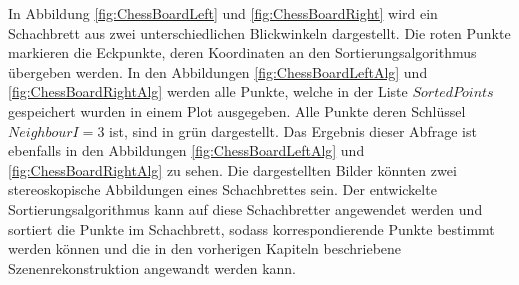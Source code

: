 



%
%
%


In Abbildung \ref{fig:ChessBoardLeft} und \ref{fig:ChessBoardRight} wird ein Schachbrett aus zwei unterschiedlichen Blickwinkeln dargestellt. Die roten Punkte markieren die Eckpunkte, deren Koordinaten an den Sortierungsalgorithmus übergeben werden. In den Abbildungen \ref{fig:ChessBoardLeftAlg} und \ref{fig:ChessBoardRightAlg} werden alle Punkte, welche in der Liste $SortedPoints$ gespeichert wurden in einem Plot ausgegeben. Alle Punkte deren Schlüssel $NeighbourI = 3$ ist, sind in grün dargestellt. Das Ergebnis dieser Abfrage ist ebenfalls in den Abbildungen \ref{fig:ChessBoardLeftAlg} und \ref{fig:ChessBoardRightAlg} zu sehen. Die dargestellten Bilder könnten zwei stereoskopische Abbildungen eines Schachbrettes sein. Der entwickelte Sortierungsalgorithmus kann auf diese Schachbretter angewendet werden und sortiert die Punkte im Schachbrett, sodass korrespondierende Punkte bestimmt werden können und die in den vorherigen Kapiteln beschriebene Szenenrekonstruktion angewandt werden kann. 





